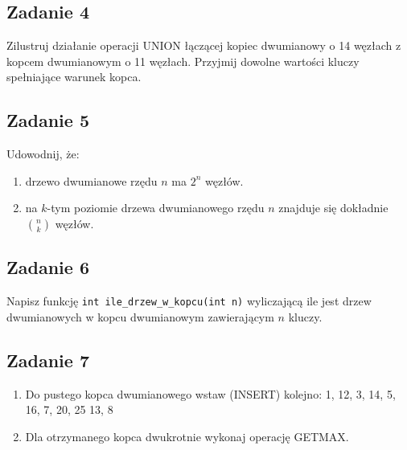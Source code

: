 \documentclass{article}
\begin{document}
\subsection*{Zadanie 4}
Zilustruj działanie operacji UNION łączącej kopiec dwumianowy o 14 węzłach z kopcem
dwumianowym o 11 węzłach. Przyjmij dowolne wartości kluczy spełniające warunek kopca.

\subsection*{Zadanie 5}
Udowodnij, że:
\begin{enumerate}[label=(\alph*)]
	\item drzewo dwumianowe rzędu $n$ ma $2^n$ węzłów.
	\item na $k$-tym poziomie drzewa dwumianowego rzędu $n$ znajduje się dokładnie $n \choose k$ węzłów.
\end{enumerate}

\subsection*{Zadanie 6}
Napisz funkcję \verb`int ile_drzew_w_kopcu(int n)` wyliczającą ile jest drzew dwumianowych w kopcu
dwumianowym zawierającym $n$ kluczy.

\subsection*{Zadanie 7}
\begin{enumerate}[label=(\alph*)]
	\item Do pustego kopca dwumianowego wstaw (INSERT) kolejno: 1, 12, 3, 14, 5, 16, 7, 20, 25 13, 8
	\item Dla otrzymanego kopca dwukrotnie wykonaj operację GETMAX.
\end{enumerate}
\end{document}
